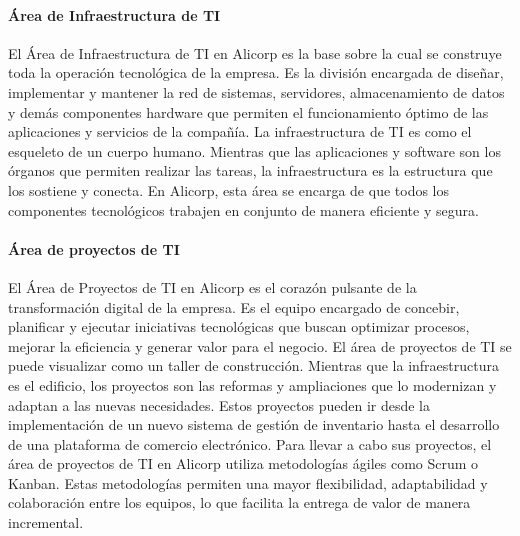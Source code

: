         \paragraph{Área de Infraestructura de TI}
        El Área de Infraestructura de TI en Alicorp es la base sobre la cual se construye toda la operación tecnológica de la empresa. Es la división encargada de diseñar, implementar y mantener la red de sistemas, servidores, almacenamiento de datos y demás componentes hardware que permiten el funcionamiento óptimo de las aplicaciones y servicios de la compañía. 
        La infraestructura de TI es como el esqueleto de un cuerpo humano. Mientras que las aplicaciones y software son los órganos que permiten realizar las tareas, la infraestructura es la estructura que los sostiene y conecta. En Alicorp, esta área se encarga de que todos los componentes tecnológicos trabajen en conjunto de manera eficiente y segura. 
        \paragraph{Área de proyectos de TI}
        El Área de Proyectos de TI en Alicorp es el corazón pulsante de la transformación digital de la empresa. Es el equipo encargado de concebir, planificar y ejecutar iniciativas tecnológicas que buscan optimizar procesos, mejorar la eficiencia y generar valor para el negocio. 
        El área de proyectos de TI se puede visualizar como un taller de construcción. Mientras que la infraestructura es el edificio, los proyectos son las reformas y ampliaciones que lo modernizan y adaptan a las nuevas necesidades. Estos proyectos pueden ir desde la implementación de un nuevo sistema de gestión de inventario hasta el desarrollo de una plataforma de comercio electrónico. 
        Para llevar a cabo sus proyectos, el área de proyectos de TI en Alicorp utiliza metodologías ágiles como Scrum o Kanban. Estas metodologías permiten una mayor flexibilidad, adaptabilidad y colaboración entre los equipos, lo que facilita la entrega de valor de manera incremental. 
